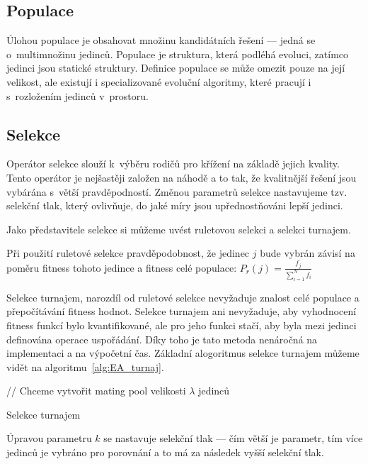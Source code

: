 \subsection{Populace}
Úlohou populace je obsahovat množinu kandidátních řešení --- jedná se o~multimnožinu jedinců.
Populace je struktura, která podléhá evoluci, zatímco jedinci jsou statické struktury.
Definice populace se může omezit pouze na její velikost, ale existují i specializované evoluční algoritmy, které pracují i s~rozložením jedinců v~prostoru.


\subsection{Selekce}
Operátor selekce slouží k~výběru rodičů pro křížení na základě jejich kvality.
Tento operátor je nejšastěji založen na náhodě a to tak, že kvalitnější řešení jsou vybárána s~větší pravděpodností.
Změnou parametrů selekce nastavujeme tzv. selekční tlak, který ovlivňuje, do jaké míry jsou upřednostňováni lepší jedinci.

Jako představitele selekce si můžeme uvést ruletovou selekci a selekci turnajem.

Při použití ruletové selekce pravděpodobnost, že jedinec $j$ bude vybrán závisí na poměru fitness tohoto jedince a fitness celé populace:
$P_r(j) = \frac{f_j}{\sum_{i=1}^{N}f_i}$

Selekce turnajem, narozdíl od ruletové selekce nevyžaduje znalost celé populace a přepočítávání fitness hodnot.
Selekce turnajem ani nevyžaduje, aby vyhodnocení fitness funkcí bylo kvantifikované, ale pro jeho funkci stačí, aby byla mezi jedinci definována operace uspořádání.
Díky toho je tato metoda nenáročná na implementaci a na výpočetní čas.
Základní alogoritmus selekce turnajem můžeme vidět na algoritmu~\ref{alg:EA_turnaj}.

\begin{algorithm}[H]
    // Chceme vytvořit mating pool velikosti $\lambda$ jedinců\;
    \caption{Selekce turnajem}
    \label{alg:EA_turnaj}
\end{algorithm}

Úpravou parametru $k$ se nastavuje selekční tlak --- čím větší je parametr, tím více jedinců je vybráno pro porovnání a to má za následek vyšší selekční tlak.

